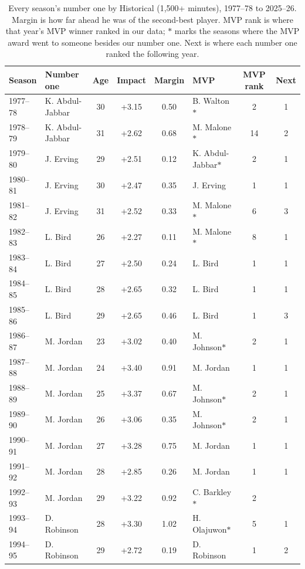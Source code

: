 \documentclass[11pt]{article}
\begin{document}
\begin{table}[p]
\centering\scriptsize
\caption{Every season's number one by \gravity{} Historical (1,500+ minutes), 1977--78 to 2025--26.
Margin is how far ahead he was of the second-best player. MVP rank is where that year's MVP winner
ranked in our data; $\ast$ marks the seasons where the MVP award went to someone besides our number
one. Next is where each number one ranked the following year.}
\setlength{\tabcolsep}{5pt}
\begin{tabular}{llcccl cc}
\toprule
Season & Number one & Age & Impact & Margin & MVP & MVP rank & Next \\
\midrule
1977--78 & K. Abdul-Jabbar & 30 & +3.15 & 0.50 & B. Walton$\ast$ & 2 & 1 \\
1978--79 & K. Abdul-Jabbar & 31 & +2.62 & 0.68 & M. Malone$\ast$ & 14 & 2 \\
1979--80 & J. Erving & 29 & +2.51 & 0.12 & K. Abdul-Jabbar$\ast$ & 2 & 1 \\
1980--81 & J. Erving & 30 & +2.47 & 0.35 & J. Erving & 1 & 1 \\
1981--82 & J. Erving & 31 & +2.52 & 0.33 & M. Malone$\ast$ & 6 & 3 \\
1982--83 & L. Bird & 26 & +2.27 & 0.11 & M. Malone$\ast$ & 8 & 1 \\
1983--84 & L. Bird & 27 & +2.50 & 0.24 & L. Bird & 1 & 1 \\
1984--85 & L. Bird & 28 & +2.65 & 0.32 & L. Bird & 1 & 1 \\
1985--86 & L. Bird & 29 & +2.65 & 0.46 & L. Bird & 1 & 3 \\
1986--87 & M. Jordan & 23 & +3.02 & 0.40 & M. Johnson$\ast$ & 2 & 1 \\
1987--88 & M. Jordan & 24 & +3.40 & 0.91 & M. Jordan & 1 & 1 \\
1988--89 & M. Jordan & 25 & +3.37 & 0.67 & M. Johnson$\ast$ & 2 & 1 \\
1989--90 & M. Jordan & 26 & +3.06 & 0.35 & M. Johnson$\ast$ & 2 & 1 \\
1990--91 & M. Jordan & 27 & +3.28 & 0.75 & M. Jordan & 1 & 1 \\
1991--92 & M. Jordan & 28 & +2.85 & 0.26 & M. Jordan & 1 & 1 \\
1992--93 & M. Jordan & 29 & +3.22 & 0.92 & C. Barkley$\ast$ & 2 &  \\
1993--94 & D. Robinson & 28 & +3.30 & 1.02 & H. Olajuwon$\ast$ & 5 & 1 \\
1994--95 & D. Robinson & 29 & +2.72 & 0.19 & D. Robinson & 1 & 2 \\

\end{tabular}
\end{table}
\end{document}
